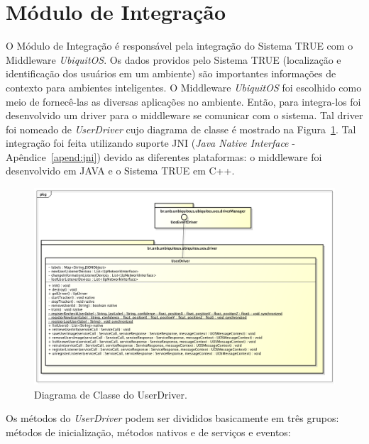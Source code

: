 \section{Módulo de Integração}

	O Módulo de Integração é responsável pela integração do Sistema TRUE  com o
	Middleware \textit{UbiquitOS}. Os dados providos pelo Sistema TRUE (localização
	e identificação dos usuários em um ambiente) são importantes informações de
	contexto para ambientes inteligentes. O Middleware \textit{UbiquitOS} foi
	escolhido como meio de fornecê-las as diversas aplicações no ambiente. Então,
	para integra-los foi desenvolvido um driver para o middleware se comunicar
	com o sistema. Tal driver foi nomeado de \textit{UserDriver} cujo diagrama de classe
	é mostrado na Figura~\ref{fig:userdriver}. Tal integração foi feita utilizando
	suporte JNI (\textit{Java Native Interface} - Apêndice~\ref{apend:jni}) devido
	as diferentes plataformas: o middleware foi desenvolvido em JAVA e o Sistema TRUE em C++.

	\begin{figure}[htb]
		\begin{center}
			\includegraphics[scale=0.45]{figuras/4.ProblemaEProposta/diagrama-classe-userdriver.png}
		\end{center}
		\caption{Diagrama de Classe do UserDriver.}
		\label{fig:userdriver}
	\end{figure}

Os métodos do \textit{UserDriver} podem ser divididos basicamente em três grupos: métodos de inicialização, métodos nativos e de serviços e eventos:

